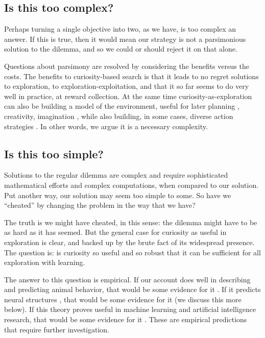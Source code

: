 \subsection*{Is this too complex?}
Perhaps turning a single objective into two, as we have, is too complex an answer. If this is true, then it would mean our strategy is not a parsimonious solution to the dilemma, and so we could or should reject it on that alone. 

Questions about parsimony are resolved by considering the benefits versus the costs. The benefits to curiosity-based search is that it leads to no regret solutions to exploration, to exploration-exploitation, and that it so far seems to do very well in practice, at reward collection. At the same time curiosity-as-exploration can also be building a model of the environment, useful for later planning \citep{Ahilan2019,Poucet1993}, creativity, imagination \citep{Schmidhuber2010}, while also building, in some cases, diverse action strategies \citep{Lehman2011a,Lehman2013,Mouret2015,Colas2020}. In other words, we argue it is a necessary complexity. 


\subsection*{Is this too simple?}
Solutions to the regular dilemma are complex and require sophisticated mathematical efforts and complex computations, when compared to our solution. Put another way, our solution may seem too simple to some. So have we ``cheated'' by changing the problem in the way that we have?

The truth is we might have cheated, in this sense: the dilemma might have to be as hard as it has seemed. But the general case for curiosity as useful in exploration is clear, and backed up by the brute fact of its widespread presence. The question is: is curiosity so useful and so robust that it can be sufficient for all exploration with learning. 

The answer to this question is empirical. If our account does well in describing and predicting animal behavior, that would be some evidence for it \citep{Sumner2019,Wang2019,Jaegle2019,Gottlieb2018,Kidd2015,Berlyne1950,Colas2020a,Rahnev2018,Wilson2020,CogliatiDezza2017b,Berger-Tal2014}. If it predicts neural structures \citep{Cisek2019,Kobayashi2019}, that would be some evidence for it (we discuss this more below). If this theory proves useful in machine learning and artificial intelligence research, that would be some evidence for it \citep{Burda2018,Schmidhuber1991,deAbril2018,Fister2019,Lehman2011a,Stanley2004a,Colas2020,Cully2015,Wilson2020,Pathak2019}. These are empirical predictions that require further investigation.


